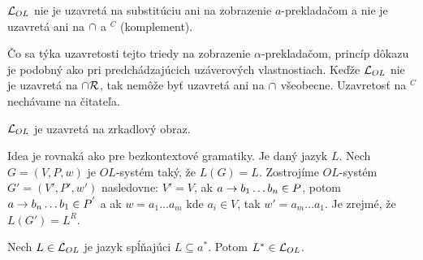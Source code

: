 \begin{dosledok}
    $\mathcal{L}_{OL}$ nie je uzavretá na substitúciu ani na
    zobrazenie $a$-prekladačom a nie je uzavretá ani na $\cap$ a
    $^{C}$ (komplement).
\end{dosledok}

\begin{dokaz}
    Čo sa týka uzavretosti tejto triedy na zobrazenie $\alpha$-prekladačom,
    princíp dôkazu je podobný ako pri predchádzajúcich uzáverových
    vlastnostiach. Keďže $\mathcal{L}_{OL}$ nie je uzavretá na
    $\cap \mathcal{R}$, tak nemôže byť uzavretá ani na $\cap$
    všeobecne. Uzavretosť na $^{C}$ nechávame na čitateľa.
\end{dokaz}


\begin{veta}
    $\mathcal{L}_{OL}$ je uzavretá na zrkadlový obraz.
\end{veta}

\begin{dokaz}
    Idea je rovnaká ako pre bezkontextové gramatiky. Je daný jazyk
    $L$. Nech $G=(V,P,w)$ je $OL$-systém taký, že $L(G)=L$. Zostrojíme
    $OL$-systém $G'=(V',P',w')$ nasledovne: $V'=V$, ak 
    $a\rightarrow b_{1}\dots b_{n}\in P$,
    potom $a\rightarrow b_{n}\dots b_{1}\in P^{'}$ a ak
    $w=a_{1}\dots a_{m}$ kde $a_i\in V$, tak $w'=a_{m}\dots
    a_{1}$. Je zrejmé, že $L(G')=L^{R}$.
\end{dokaz}


\begin{veta}
    Nech $L \in \mathcal{L}_{OL}$ je jazyk spĺňajúci $L\subseteq a^{*}$.
    Potom $L^{*} \in \mathcal{L}_{OL}$.
\end{veta}

